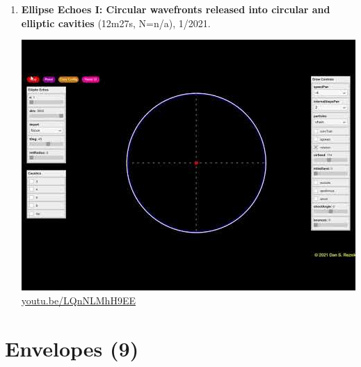 \documentclass[12pt]{amsart}
\begin{document}
\begin{enumerate}[resume]
\item \textbf{Ellipse Echoes I: Circular wavefronts released into circular and elliptic cavities} (12m27s, N=n/a), 1/2021. 
\begin{center}\includegraphics[width=.5\textwidth]{pics/LQnNLMhH9EE.jpg} \\ 
\href{https://youtu.be/LQnNLMhH9EE}{\url{youtu.be/LQnNLMhH9EE}}\end{center}
% 
\end{enumerate}

\section{Envelopes (9)}
\end{document}
